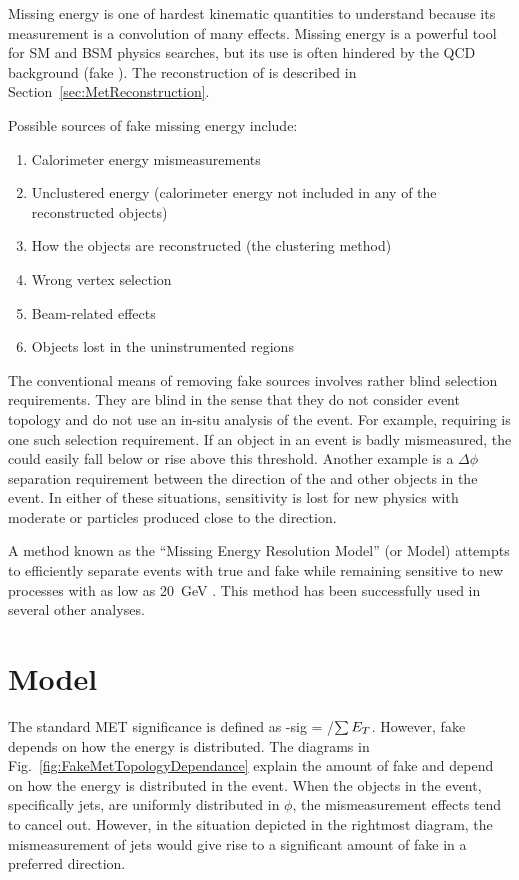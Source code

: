 \vspace{0.015\textheight}
Missing energy is one of hardest kinematic quantities to understand because its measurement is a convolution of many effects. Missing energy is a powerful tool for SM and BSM physics searches, but its use is often hindered by the QCD background (fake \met). The reconstruction of \met is described in Section~\ref{sec:MetReconstruction}.

\begin{singlespace}
Possible sources of fake missing energy include:
\begin{enumerate}
 \item Calorimeter energy mismeasurements
 \item Unclustered energy (calorimeter energy not included in any of the reconstructed objects)
 \item How the objects are reconstructed (the clustering method)
 \item Wrong vertex selection
 \item Beam-related effects
 \item Objects lost in the uninstrumented regions
\end{enumerate}
\end{singlespace}

The conventional means of removing fake \met sources involves rather blind selection requirements. They are blind in the sense that they do not consider event topology and do not use an in-situ analysis of the event. For example, requiring  is one such selection requirement. If an object in an event is badly mismeasured, the \met could easily fall below or rise above this threshold. Another example is a $\Delta \phi$ separation requirement between the direction of the \met and other objects in the event. In either of these situations, sensitivity is lost for new physics with moderate \met or particles produced close to the \met direction.

A method known as the ``Missing Energy Resolution Model'' (or \met Model) attempts to efficiently separate events with true and fake \met while remaining sensitive to new processes with \met as low as 20~GeV \cite{cdfnote:9184}. This method has been successfully used in several other analyses.

\section{\met Model}
The standard MET significance is defined as \met-sig = \met/$\sum \mbox{$E_T$}$. However, fake \met depends on how the energy is distributed. The diagrams in Fig.~\ref{fig:FakeMetTopologyDependance} explain the amount of fake \met and depend on how the energy is distributed in the event. When the objects in the event, specifically jets, are uniformly distributed in $\phi$, the mismeasurement effects tend to cancel out. However, in the situation depicted in the rightmost diagram, the mismeasurement of jets would give rise to a significant amount of fake \met in a preferred direction.

